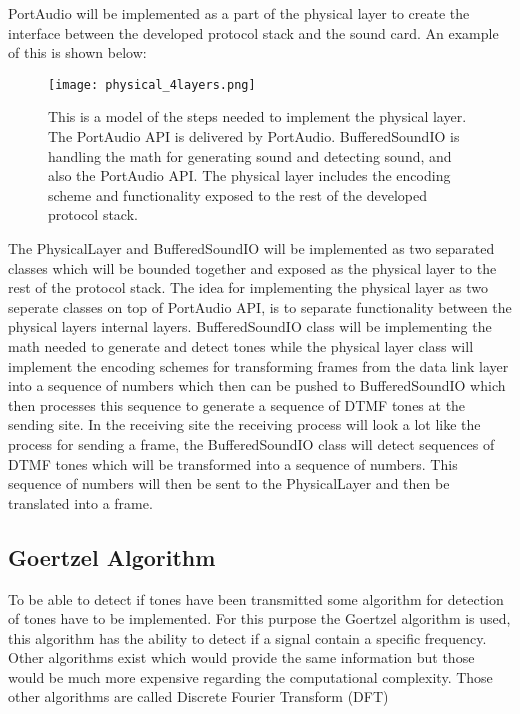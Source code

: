 	PortAudio will be implemented as a part of the physical layer to create the interface between the developed
	protocol stack and the sound card. An example of this is shown below:
	
	\begin{figure}[htb]
		\begin{center}
		\texttt{[image: physical\_4layers.png]}%
		\caption{This is a model of the steps needed to implement the physical layer. The PortAudio API is delivered
		by PortAudio. BufferedSoundIO is handling the math for generating sound and detecting sound, and also the
		PortAudio API. The physical layer includes the encoding scheme and functionality exposed to the rest of the
		developed protocol stack.}
		\label{fig:physical_4layers}
		\end{center}
	\end{figure}
	
	The PhysicalLayer and BufferedSoundIO will be implemented as two separated classes which will be bounded together
	and exposed as the physical layer to the rest of the protocol stack. The idea for implementing the physical layer
	as two seperate classes on top of PortAudio API, is to separate functionality between the physical layers internal
	layers. BufferedSoundIO class will be implementing the math needed to generate and detect tones while the physical
	layer class will implement the encoding schemes for transforming frames from the data link layer into a sequence of
	numbers which then can be pushed to BufferedSoundIO which then processes this sequence to generate a sequence of DTMF
	tones at the sending site. In the receiving site the receiving process will look a lot like the process for sending a
	frame, the BufferedSoundIO class will detect sequences of DTMF tones which will be transformed into a sequence of
	numbers. This sequence of numbers will then be sent to the PhysicalLayer and then be translated into a frame.
	
	\subsection{Goertzel Algorithm}
	To be able to detect if tones have been transmitted some algorithm for detection of tones have to be implemented.
	For this purpose the Goertzel algorithm is used, this algorithm has the ability to detect if a signal contain a
	specific frequency. Other algorithms exist which would provide the same information but those would be
	much more expensive regarding the computational complexity. Those other algorithms are called Discrete Fourier Transform (DFT)
	
